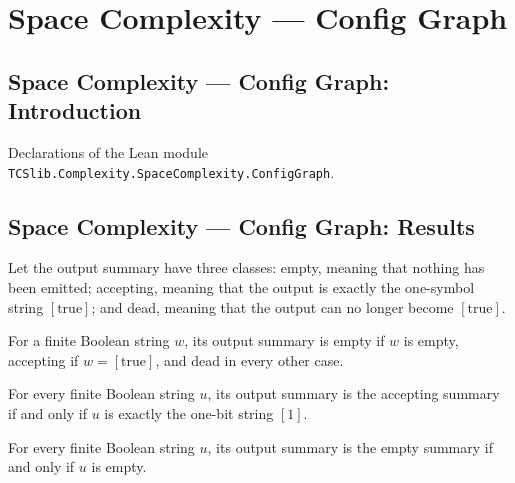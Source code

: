 \section{Space Complexity --- Config Graph}
\subsection*{Space Complexity --- Config Graph: Introduction}

Declarations of the Lean module \texttt{TCSlib.Complexity.SpaceComplexity.ConfigGraph}.

\subsection*{Space Complexity --- Config Graph: Results}

\begin{definition}
\label{Turing.OutSummary}
\leanok
Let the output summary have three classes: empty, meaning that nothing has been emitted;
accepting, meaning that the output is exactly the one-symbol string $[\mathrm{true}]$;
and dead, meaning that the output can no longer become $[\mathrm{true}]$.
\end{definition}

\begin{definition}
\label{Turing.outSummary}
\leanok
{}
For a finite Boolean string $w$, its output summary is empty if $w$ is empty, accepting
if $w=[\mathrm{true}]$, and dead in every other case.
\end{definition}

\begin{theorem}
\label{Turing.outSummary_eq_accept_iff}
\leanok
{}
For every finite Boolean string $u$, its output summary is the accepting summary if and
only if $u$ is exactly the one-bit string $[1]$.
\end{theorem}

\begin{theorem}
\label{Turing.outSummary_eq_empty_iff}
\leanok
{}
For every finite Boolean string $u$, its output summary is the empty summary if and only
if $u$ is empty.
\end{theorem}

